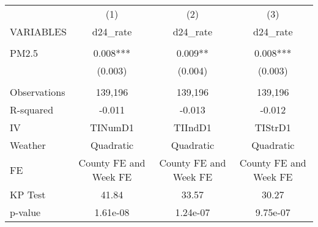 \begin{tabular}{lccc} \hline
 & (1) & (2) & (3) \\
VARIABLES & d24\_rate & d24\_rate & d24\_rate \\ \hline
 &  &  &  \\
PM2.5 & 0.008*** & 0.009** & 0.008*** \\
 & (0.003) & (0.004) & (0.003) \\
 &  &  &  \\
Observations & 139,196 & 139,196 & 139,196 \\
R-squared & -0.011 & -0.013 & -0.012 \\
IV & TINumD1 & TIIndD1 & TIStrD1 \\
Weather & Quadratic & Quadratic & Quadratic \\
FE & County FE and Week FE & County FE and Week FE & County FE and Week FE \\
KP Test & 41.84 & 33.57 & 30.27 \\
 p-value & 1.61e-08 & 1.24e-07 & 9.75e-07 \\ \hline
\end{tabular}
